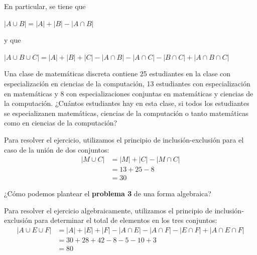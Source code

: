 \documentclass[12pt]{article}
\begin{document}
En particular, se tiene que

\begin{center}
    $| A \cup B | = |A| + |B| - | A \cap B |$
\end{center}

y que

\begin{center}
    $| A \cup B \cup C | = |A| + |B| + |C| - | A \cap B | - | A \cap C | - | B \cap C | + | A \cap B \cap C |$
\end{center}

\begin{ejemplo}
    Una  clase  de  matemáticas  discreta  contiene  25  estudiantes  en  la clase  con  especialización  en  ciencias  de  la  computación,  13  estudiantes  con  especialización  en  matemáticas  y  8  con especializaciones conjuntas  en  matemáticas  y  ciencias  de  la  computación.  ¿Cuántos estudiantes hay en esta clase, si todos los estudiantes se especializanen  matemáticas,  ciencias  de  la  computación  o  tanto  matemáticas como en ciencias de la computación?
\end{ejemplo}

\begin{solucion}
    Para resolver el ejercicio, utilizamos el principio de inclusión-exclusión para el caso de la unión de dos conjuntos:
    \begin{align*}
        | M \cup C | & = |M| + |C| - | M \cap C | \\
        & = 13 + 25 - 8 \\
        & = 30
    \end{align*}
\end{solucion}

\begin{ejemplo}
    ¿Cómo  podemos  plantear  el  \textbf{problema 3}  de  una  forma  algebraica?
\end{ejemplo}

\begin{solucion}
    Para resolver el ejercicio algebraicamente, utilizamos el principio de inclusión-exclusión para determinar el total de elementos en los tres conjuntos:
    \begin{align*}
        | A \cup E \cup F | & = |A| + |E| + |F| - | A \cap E | - | A \cap F | - | E \cap F | + | A \cap E \cap F | \\
        & = 30 + 28 + 42 - 8 - 5 - 10 + 3 \\
        & = 80
    \end{align*}
\end{solucion}
\end{document}
